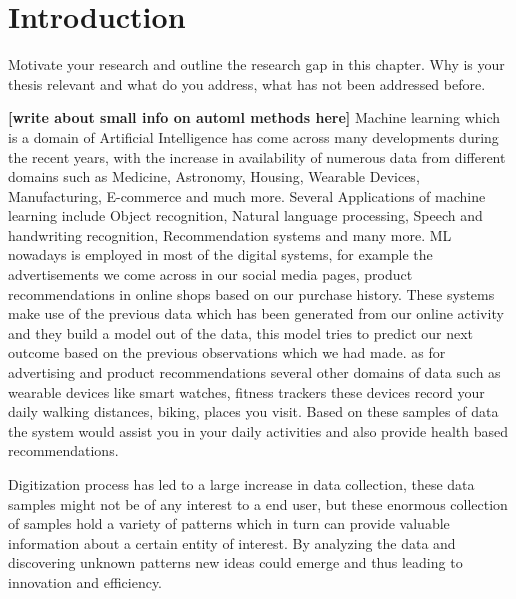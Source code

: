 \chapter{Introduction}\label{chap:introduction}


Motivate your research and outline the research gap in this chapter. Why is your thesis relevant and what do you address, what has not been addressed before. 

\textbf{[write about small info on automl methods here]}
Machine learning which is a domain of Artificial Intelligence has come across many developments during the recent years, with the increase in availability of numerous data from different domains such as Medicine, Astronomy, Housing, Wearable Devices, Manufacturing, E-commerce and much more. Several Applications of machine learning include Object recognition, Natural language processing, Speech and handwriting recognition, Recommendation systems and many more. ML nowadays is employed in most of the digital systems, for example the advertisements we come across in our social media pages, product recommendations in online shops based on our purchase history. These systems make use of the previous data which has been generated from our online activity and they build a model out of the data, this model tries to predict our next outcome based on the previous observations which we had made. as for advertising and product recommendations several other domains of data such as wearable devices like smart watches, fitness trackers these devices record your daily walking distances, biking, places you visit. Based on these samples of data the system would assist you in your daily activities and also provide health based recommendations.

Digitization\cite{6147691} process has led to a large increase in data collection, these data samples might not be of any interest to a end user, but these enormous collection of samples hold a variety of patterns which in turn can provide valuable information about a certain entity of interest. By analyzing the data and discovering unknown patterns new ideas could emerge and thus leading to innovation and efficiency.

